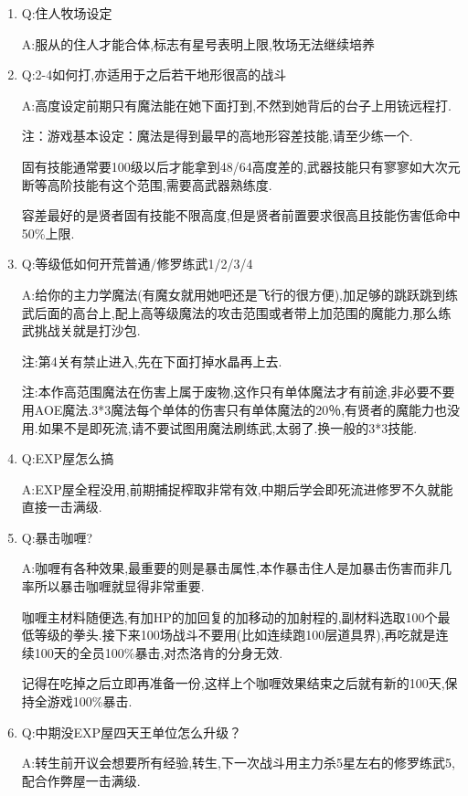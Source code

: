 \begin{enumerate}

	\item
	Q:住人牧场设定

	A:服从的住人才能合体,标志有星号表明上限,牧场无法继续培养

	\item
	Q:2-4如何打,亦适用于之后若干地形很高的战斗

	A:高度设定前期只有魔法能在她下面打到,不然到她背后的台子上用铳远程打.

	注：游戏基本设定：魔法是得到最早的高地形容差技能,请至少练一个.

	固有技能通常要100级以后才能拿到48/64高度差的,武器技能只有寥寥如大次元断等高阶技能有这个范围,需要高武器熟练度.

	容差最好的是贤者固有技能不限高度,但是贤者前置要求很高且技能伤害低命中50\%上限.

	\item
	Q:等级低如何开荒普通/修罗练武1/2/3/4

	A:给你的主力学魔法(有魔女就用她吧还是飞行的很方便),加足够的跳跃跳到练武后面的高台上,配上高等级魔法的攻击范围或者带上加范围的魔能力,那么练武挑战关就是打沙包.

	注:第4关有禁止进入,先在下面打掉水晶再上去.

	注:本作高范围魔法在伤害上属于废物,这作只有单体魔法才有前途,非必要不要用AOE魔法.3*3魔法每个单体的伤害只有单体魔法的20％,有贤者的魔能力也没用.如果不是即死流,请不要试图用魔法刷练武,太弱了.换一般的3*3技能.

	\item
	Q:EXP屋怎么搞

	A:EXP屋全程没用,前期捕捉榨取非常有效,中期后学会即死流进修罗不久就能直接一击满级.

	\item
	Q:暴击咖喱?
	
	A:咖喱有各种效果,最重要的则是暴击属性,本作暴击住人是加暴击伤害而非几率所以暴击咖喱就显得非常重要.

	咖喱主材料随便选,有加HP的加回复的加移动的加射程的,副材料选取100个最低等级的拳头.接下来100场战斗不要用(比如连续跑100层道具界),再吃就是连续100天的全员100\%暴击,对杰洛肯的分身无效.

	记得在吃掉之后立即再准备一份,这样上个咖喱效果结束之后就有新的100天,保持全游戏100\%暴击.


	\item
	Q:中期没EXP屋四天王单位怎么升级？

	A:转生前开议会想要所有经验,转生,下一次战斗用主力杀5星左右的修罗练武5,配合作弊屋一击满级.


\end{enumerate}
